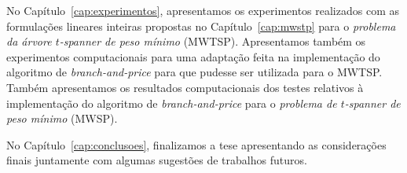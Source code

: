 No Capítulo~\ref{cap:experimentos}, apresentamos os experimentos realizados com as formulações lineares inteiras propostas no Capítulo~\ref{cap:mwstp} para o \textit{problema da árvore $t$-spanner de peso mínimo} (MWTSP).
Apresentamos também os experimentos computacionais para uma adaptação feita na
  implementação do algoritmo de \emph{branch-and-price} para que pudesse ser
utilizada para o MWTSP.
Também apresentamos os resultados computacionais dos testes relativos à implementação do algoritmo de \emph{branch-and-price} para o \textit{problema de
  $t$-spanner de peso mínimo} (MWSP). 


No Capítulo~\ref{cap:conclusoes}, finalizamos a tese apresentando
  as considerações finais juntamente com algumas sugestões de trabalhos
  futuros.

